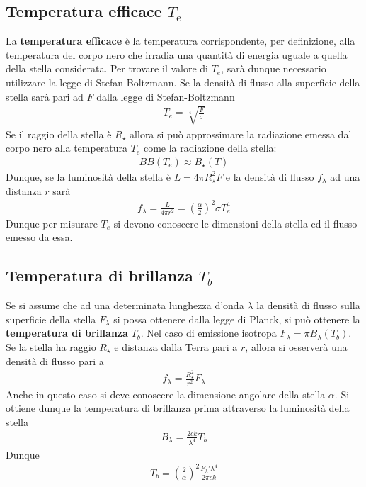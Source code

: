 \documentclass[a4paper, oneside]{book}
\begin{document}
\subsection{Temperatura efficace $T_{\text{e}}$}
La \textbf{temperatura efficace} è la temperatura corrispondente, per definizione,
alla temperatura del corpo nero che irradia una quantità di energia uguale a quella della stella considerata.
Per trovare il valore di $T_{e}$, sarà dunque necessario utilizzare la legge di Stefan-Boltzmann. Se la densità di flusso
alla superficie della stella sarà pari ad $F$ dalla legge di Stefan-Boltzmann
\begin{align}
    T_e = \sqrt[4]{\frac{F}{\sigma}} 
\end{align}
Se il raggio della stella è $R_\star$ allora si può approssimare la radiazione emessa
dal corpo nero alla temperatura $T_e$ come la radiazione della stella:
\begin{gather*}
    BB(T_e) \approx B_\star(T)
\end{gather*}
Dunque, se la luminosità della stella è $L = 4\pi R_\star^{2}F$ e la densità di flusso $f_\lambda$ ad 
una distanza $r$ sarà 
\begin{gather*}
    f_\lambda = \frac{L}{4\pi r^{2}} = \left(\frac{\alpha}{2}\right)^{2}\sigma T_e^{4} 
\end{gather*}
Dunque per misurare $T_e$ si devono conoscere le dimensioni della stella ed il flusso 
emesso da essa. 

\subsection{Temperatura di brillanza $T_b$}
Se si assume che ad una determinata lunghezza d'onda $\lambda$ la densità di flusso sulla superficie 
della stella $F_\lambda$ si possa ottenere dalla legge di Planck, si può ottenere la \textbf{temperatura di brillanza}
$T_b$. Nel caso di emissione isotropa $F_\lambda = \pi B_\lambda(T_b)$. Se la stella ha raggio
$R_\star$ e distanza dalla Terra pari a $r$, allora si osserverà una densità di flusso pari a
\begin{align}
    f_\lambda = \frac{R_\star^{2}}{r^{2}}F_\lambda
\end{align}
Anche in questo caso si deve conoscere la dimensione angolare della stella $\alpha$. Si ottiene dunque
la temperatura di brillanza prima attraverso la luminosità della stella
\begin{gather*}
    B_\lambda = \frac{2ck}{\lambda^{4}}T_b
\end{gather*}
Dunque
\begin{align}
    T_b = \left(\frac{2}{\alpha}\right)^{2} \frac{F_\lambda' \lambda^{4}}{2\pi ck}  
\end{align}
\end{document}
